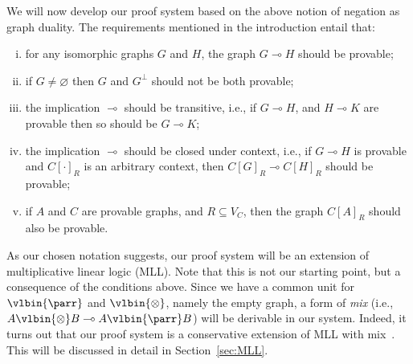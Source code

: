 \documentclass{lmcs} %
\def\limp{\multimap}
\renewcommand{\emptyset}{\varnothing}
\newcommand{\coons}[2]{[#1]_{#2}}														%
\newcommand{\coonso}[1]{[\cdot]_{#1}}
\def\cneg#1{{#1^\bot}}
\def\lpar{\vlbin{\parr}}
\def\ltens{\vlbin{\otimes}}
\def\gA{A}
\def\gC{C}
\def\gG{G}
\def\gH{H}
\def\gK{K}
\newcommand{\vertices}[1][]{V_{#1}}
\newcommand{\vC}{\vertices[C]}
\theoremstyle{plain}
\begin{document}
We will now develop our proof system based on the above notion of
negation as graph duality. The requirements mentioned in the
introduction entail that:
\begin{enumerate}[(i)]
\item\label{l:id} for any isomorphic graphs $\gG$ and $\gH$, the graph
$\gG\limp\gH$ should be provable;
\item if $\gG\neq\emptyset$ then
$\gG$ and $\cneg\gG$ should not be both provable;
\item the implication $\limp$ should be transitive, i.e., if $\gG\limp\gH$, and
  $\gH\limp\gK$ are provable then so should be $\gG\limp\gK$;
\item the implication $\limp$ should be closed under context,
i.e., if $\gG\limp\gH$ is provable and
$\gC\coonso R$ is an arbitrary context, then
$\gC\coons{\gG}R\limp\gC\coons{\gH}R$ should be provable;
\item\label{l:ssu} if $\gA$ and $\gC$ are provable graphs, and $R\subseteq\vC$,
  then the graph $\gC\coons\gA R$ should also be provable.
\end{enumerate}

As our chosen notation suggests, our proof system will be an extension of multiplicative linear logic (MLL). Note that this is not our starting point, but a consequence of the conditions above. Since we have a common unit for $\lpar$ and $\ltens$, namely the empty graph, a form of \emph{mix} (i.e., $A\ltens B\limp A\lpar B$) will be derivable in our system. Indeed, it turns out that our proof system is a conservative extension of MLL with mix~\cite{girard:87,bellin:mix,fleury:retore:94}. This will be discussed in detail in Section~\ref{sec:MLL}.
\end{document}
